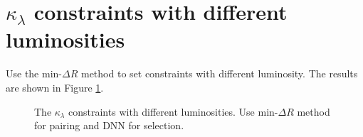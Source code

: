 \documentclass[12pt]{article}
\begin{document}
\section{\texorpdfstring{$\kappa_\lambda$}{kappa} constraints with different luminosities}%
\label{sec:kappa_constraints_with_different_luminosities}
	Use the $\text{min-}\Delta R$ method to set constraints with different luminosity. The results are shown in Figure \ref{fig:kappa_constraint_luminosity}.
	\begin{figure}[htpb]
		\centering
		\caption{The $\kappa_\lambda$ constraints with different luminosities. Use $\text{min-}\Delta R$ method for pairing and DNN for selection.}
		\label{fig:kappa_constraint_luminosity}
	\end{figure}
\end{document}
